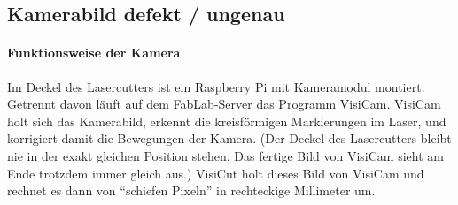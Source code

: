 \documentclass{\basedir/fablab-document}
\begin{document}
	\subsection{Kamerabild defekt / ungenau}
	\label{sec:wartung-visicam}
	\paragraph{Funktionsweise der Kamera}
	Im Deckel des Lasercutters ist ein Raspberry Pi mit Kameramodul montiert. Getrennt davon läuft auf dem FabLab-Server das Programm VisiCam.
	VisiCam holt sich das Kamerabild, erkennt die kreisförmigen Markierungen im Laser, und korrigiert damit die Bewegungen der Kamera. (Der Deckel des Lasercutters bleibt nie in der exakt gleichen Position stehen. Das fertige Bild von VisiCam sieht am Ende trotzdem immer gleich aus.)
	VisiCut holt dieses Bild von VisiCam und rechnet es dann von \enquote{schiefen Pixeln} in rechteckige Millimeter um.
\end{document}

